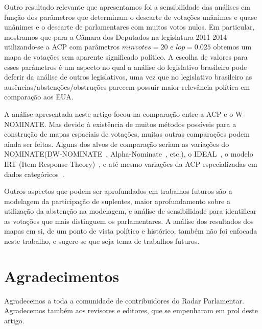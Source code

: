 \documentclass[
	article,			%
	12pt,				%
    twoside,			%
	a4paper,			%
	english,			%
	french,				%
	spanish,			%
	brazil,				%
	]{abntex2}
\newcommand\nominate{NOMINATE\xspace}
\newcommand\wnominate{W-NOMINATE\xspace}
\begin{document}
Outro resultado relevante que apresentamos foi a sensibilidade das análises em função dos parâmetros que determinam o descarte de votações unânimes e quase unânimes e o descarte de parlamentares com muitos votos nulos. Em particular, mostramos que para a Câmara dos Deputados na legislatura 2011-2014 utilizando-se a ACP com parâmetros $minvotes=20$ e $lop=0.025$ obtemos um mapa de votações sem aparente significado político. A escolha de valores para esses parâmetros é um aspecto no qual a análise do legislativo brasileiro pode deferir da análise de outros legislativos, uma vez que no legislativo brasileiro as ausências/abstenções/obstruções parecem possuir maior relevância política em comparação aos EUA.

A análise apresentada neste artigo focou na comparação entre a ACP e o \wnominate. Mas devido à existência de muitos métodos possíveis para a construção de mapas espaciais de votações, muitas outras comparações podem ainda ser feitas. Alguns dos alvos de comparação seriam as variações do \nominate (DW-NOMINATE~\cite{poole2001dnomiante}, Alpha-Nominate~\cite{carroll2013alpha}, etc.), o IDEAL~\cite{clinton2004ideal}, o modelo  IRT (Item Response Theory)~\cite{linden2013irt}, e até mesmo variações da ACP especializadas em dados categóricos~\cite{landgraf2015logisticpca}.

Outros aspectos que podem ser aprofundados em trabalhos futuros são a modelagem da participação de suplentes, maior aprofundamento sobre a utilização da abstenção na modelagem, e análise de sensibilidade para identificar as votações que mais distinguem os parlamentares. 
%
A análise dos resultados dos mapas em si, de um ponto de vista político e histórico, também não foi enfocada neste trabalho, e sugere-se que seja tema de trabalhos futuros.

\section*{Agradecimentos}

\noindent
Agradecemos a toda a comunidade de contribuidores do Radar Parlamentar. Agradecemos também aos revisores e editores, que se empenharam em prol deste artigo.

\end{document}
